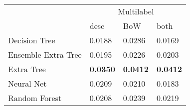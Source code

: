 \begin{tabular}{|l|l|l|l| }
\hline
 &  \multicolumn{3}{c|}{Multilabel} \\
\cline{2-4} & desc & BoW & both \\ \hline
Decision Tree       & 0.0188 & 0.0286 & 0.0169\\
Ensemble Extra Tree & 0.0195 & 0.0226 & 0.0203\\
Extra Tree          & {\bf 0.0350} & {\bf 0.0412} & {\bf 0.0412}\\
Neural Net          & 0.0209 & 0.0210 & 0.0183\\
Random Forest       & 0.0208 & 0.0239 & 0.0219\\
\hline
\end{tabular}